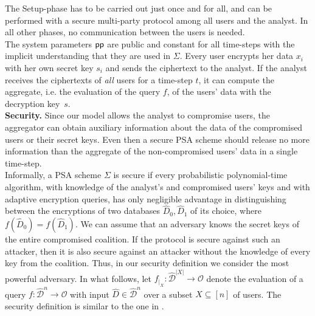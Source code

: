 \documentclass[10pt]{extarticle}
\begin{document}
The Setup-phase has to be carried out just once and for all, and can be performed with a secure multi-party protocol among all users and the analyst. In all other phases, no communication between the users is needed.\\
The system parameters $\mbox{\upshape\sffamily pp}$ are public and constant for all time-steps with the implicit understanding that they are used in $\Sigma$. Every user encrypts her data $x_i$ with her own secret key $s_i$ and sends the ciphertext to the analyst. If the analyst receives the ciphertexts of \textit{all} users for a time-step $t$, it can compute the aggregate, i.e. the evaluation of the query $f$, of the users' data with the decryption key~$s$.\\

\noindent\textbf{Security.} Since our model allows the analyst to compromise users, the aggregator can obtain auxiliary information about the data of the compromised users or their secret keys. Even then a secure PSA scheme should release no more information than the aggregate of the non-compromised users' data in a single time-step.\\
Informally, a PSA scheme $\Sigma$ is secure if every probabilistic polynomial-time algorithm, with knowledge of the analyst's and compromised users' keys and with adaptive encryption queries, has only negligible advantage in distinguishing between the encryptions of two databases $\widehat{D}_0, \widehat{D}_1$ of its choice, where $f(\widehat{D}_0)=f(\widehat{D}_1)$. We can assume that an adversary knows the secret keys of the entire compromised coalition. If the protocol is secure against such an attacker, then it is also secure against an attacker without the knowledge of every key from the coalition. Thus, in our security definition we consider the most powerful adversary. In what follows, let $f_{|_X}:\widehat{\mathcal{D}}^{|X|}\to\mathcal{O}$ denote the evaluation of a query $f:\widehat{\mathcal{D}}^n\to\mathcal{O}$ with input $\widehat{D}\in\widehat{\mathcal{D}}^n$ over a subset $X\subseteq[n]$ of users. The security definition is similar to the one in \cite{2}.
\end{document}
